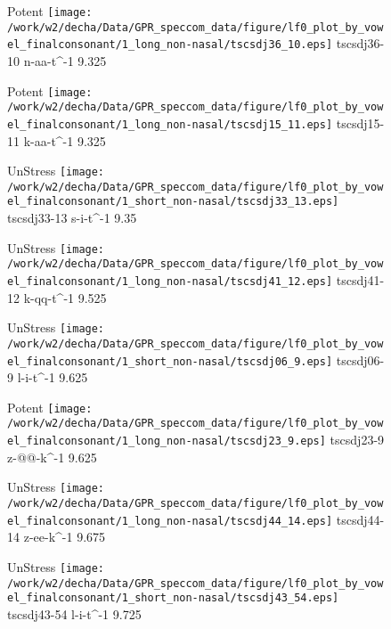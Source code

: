 \documentclass{article}
\begin{document}
\begin{figure}[t]
\begin{minipage}[b]{.24\textwidth}
\colorbox{Apricot}{Potent}
\centering
\texttt{[image: /work/w2/decha/Data/GPR\_speccom\_data/figure/lf0\_plot\_by\_vowel\_finalconsonant/1\_long\_non-nasal/tscsdj36\_10.eps]}
tscsdj36-10 n-aa-t\textasciicircum-1 9.325
\end{minipage}
\begin{minipage}[b]{.24\textwidth}
\colorbox{Apricot}{Potent}
\centering
\texttt{[image: /work/w2/decha/Data/GPR\_speccom\_data/figure/lf0\_plot\_by\_vowel\_finalconsonant/1\_long\_non-nasal/tscsdj15\_11.eps]}
tscsdj15-11 k-aa-t\textasciicircum-1 9.325
\end{minipage}
\begin{minipage}[b]{.24\textwidth}
UnStress
\centering
\texttt{[image: /work/w2/decha/Data/GPR\_speccom\_data/figure/lf0\_plot\_by\_vowel\_finalconsonant/1\_short\_non-nasal/tscsdj33\_13.eps]}
tscsdj33-13 s-i-t\textasciicircum-1 9.35
\end{minipage}
\begin{minipage}[b]{.24\textwidth}
UnStress
\centering
\texttt{[image: /work/w2/decha/Data/GPR\_speccom\_data/figure/lf0\_plot\_by\_vowel\_finalconsonant/1\_long\_non-nasal/tscsdj41\_12.eps]}
tscsdj41-12 k-qq-t\textasciicircum-1 9.525
\end{minipage}
\end{figure}

\begin{figure}[t]
\begin{minipage}[b]{.24\textwidth}
UnStress
\centering
\texttt{[image: /work/w2/decha/Data/GPR\_speccom\_data/figure/lf0\_plot\_by\_vowel\_finalconsonant/1\_short\_non-nasal/tscsdj06\_9.eps]}
tscsdj06-9 l-i-t\textasciicircum-1 9.625
\end{minipage}
\begin{minipage}[b]{.24\textwidth}
\colorbox{Apricot}{Potent}
\centering
\texttt{[image: /work/w2/decha/Data/GPR\_speccom\_data/figure/lf0\_plot\_by\_vowel\_finalconsonant/1\_long\_non-nasal/tscsdj23\_9.eps]}
tscsdj23-9 z-@@-k\textasciicircum-1 9.625
\end{minipage}
\begin{minipage}[b]{.24\textwidth}
UnStress
\centering
\texttt{[image: /work/w2/decha/Data/GPR\_speccom\_data/figure/lf0\_plot\_by\_vowel\_finalconsonant/1\_long\_non-nasal/tscsdj44\_14.eps]}
tscsdj44-14 z-ee-k\textasciicircum-1 9.675
\end{minipage}
\begin{minipage}[b]{.24\textwidth}
UnStress
\centering
\texttt{[image: /work/w2/decha/Data/GPR\_speccom\_data/figure/lf0\_plot\_by\_vowel\_finalconsonant/1\_short\_non-nasal/tscsdj43\_54.eps]}
tscsdj43-54 l-i-t\textasciicircum-1 9.725
\end{minipage}
\end{figure}
\end{document}
